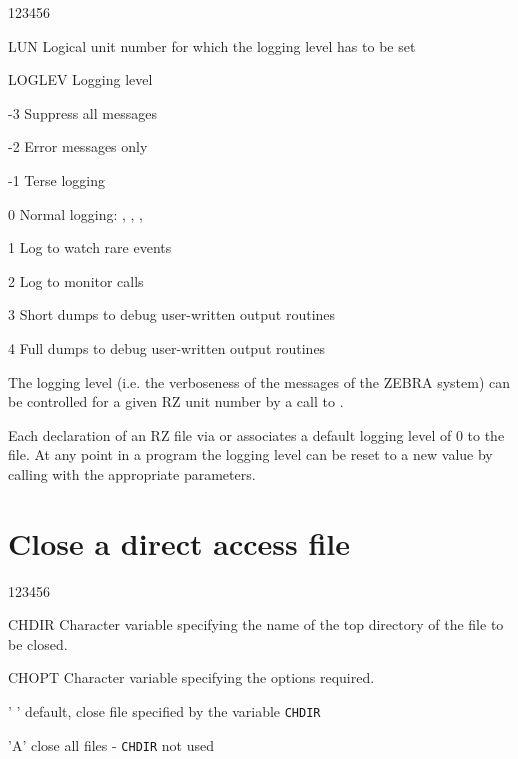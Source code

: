 \begin{DLtt}{123456}
\item[LUN]Logical unit number for which the logging level has to be set
\item[LOGLEV]Logging level
\begin{DLtt}{12}
\item[-3]Suppress all messages
\item[-2]Error messages only
\item[-1]Terse logging
\item[ 0]Normal logging: , , , 
\item[ 1]Log to watch rare events
\item[ 2]Log to monitor calls
\item[ 3]Short dumps to debug user-written output routines
\item[ 4]Full dumps to debug user-written output routines
\end{DLtt}
\end{DLtt}

The logging level
(i.e. the verboseness of the messages of the ZEBRA system) can be
controlled for a given RZ unit number by a call to .

Each declaration of an RZ file via  or 
associates a default logging level of 0 to the file.
At any point in a program the logging level can be reset to a new
value by calling  with the appropriate parameters.

\section{Close a direct access file}


\begin{DLtt}{123456}
\item[CHDIR]Character variable specifying the name of the top directory of the
file to be closed.
\item[CHOPT]Character variable specifying the options required.
\begin{DLtt}{12}
\item[' ']  default, close file specified by the variable {\tt CHDIR}
\item['A']  close all files - {\tt CHDIR} not used
\end{DLtt}
\end{DLtt}

